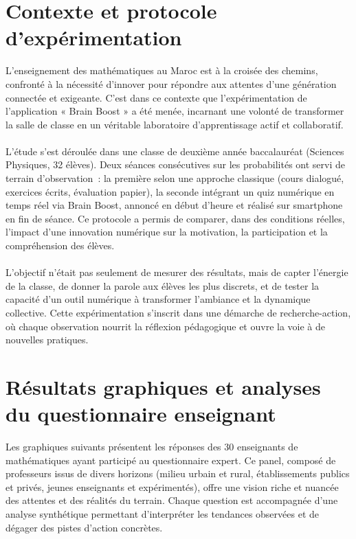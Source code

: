 \documentclass[a4paper,11pt]{report}
\begin{document}
\section{Contexte et protocole d'expérimentation}
L'enseignement des mathématiques au Maroc est à la croisée des chemins, confronté à la nécessité d'innover pour répondre aux attentes d'une génération connectée et exigeante. C'est dans ce contexte que l'expérimentation de l'application « Brain Boost » a été menée, incarnant une volonté de transformer la salle de classe en un véritable laboratoire d'apprentissage actif et collaboratif.\\ \\
L'étude s'est déroulée dans une classe de deuxième année baccalauréat (Sciences Physiques, 32 élèves). Deux séances consécutives sur les probabilités ont servi de terrain d'observation : la première selon une approche classique (cours dialogué, exercices écrits, évaluation papier), la seconde intégrant un quiz numérique en temps réel via Brain Boost, annoncé en début d'heure et réalisé sur smartphone en fin de séance. Ce protocole a permis de comparer, dans des conditions réelles, l'impact d'une innovation numérique sur la motivation, la participation et la compréhension des élèves.\\ \\
L'objectif n'était pas seulement de mesurer des résultats, mais de capter l'énergie de la classe, de donner la parole aux élèves les plus discrets, et de tester la capacité d'un outil numérique à transformer l'ambiance et la dynamique collective. Cette expérimentation s'inscrit dans une démarche de recherche-action, où chaque observation nourrit la réflexion pédagogique et ouvre la voie à de nouvelles pratiques.

\section{Résultats graphiques et analyses du questionnaire enseignant}

Les graphiques suivants présentent les réponses des 30 enseignants de mathématiques ayant participé au questionnaire expert. Ce panel, composé de professeurs issus de divers horizons (milieu urbain et rural, établissements publics et privés, jeunes enseignants et expérimentés), offre une vision riche et nuancée des attentes et des réalités du terrain. Chaque question est accompagnée d'une analyse synthétique permettant d'interpréter les tendances observées et de dégager des pistes d'action concrètes.
\end{document}
